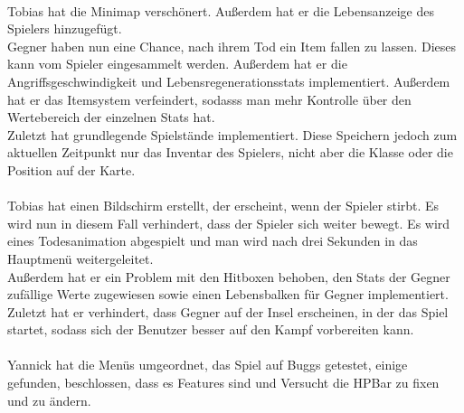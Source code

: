          \\
            Tobias hat die Minimap verschönert.
            Außerdem hat er die Lebensanzeige des Spielers hinzugefügt.\\
            Gegner haben nun eine Chance, nach ihrem Tod ein Item fallen zu lassen. Dieses kann vom Spieler eingesammelt werden.
            Außerdem hat er die Angriffsgeschwindigkeit und Lebensregenerationsstats implementiert.
            Außerdem hat er das Itemsystem verfeindert, sodasss man mehr Kontrolle über den Wertebereich der einzelnen Stats hat.\\
            Zuletzt hat grundlegende Spielstände implementiert.
            Diese Speichern jedoch zum aktuellen Zeitpunkt nur das Inventar des Spielers, nicht aber die Klasse oder die Position auf der Karte.\\

         \\
            Tobias hat einen Bildschirm erstellt, der erscheint, wenn der Spieler stirbt.
            Es wird nun in diesem Fall verhindert, dass der Spieler sich weiter bewegt.
            Es wird eines Todesanimation abgespielt und man wird nach drei Sekunden in das Hauptmenü weitergeleitet.\\
            Außerdem hat er ein Problem mit den Hitboxen behoben, den Stats der Gegner zufällige Werte zugewiesen sowie einen Lebensbalken für Gegner implementiert.\\
            Zuletzt hat er verhindert, dass Gegner auf der Insel erscheinen, in der das Spiel startet, sodass sich der Benutzer besser auf den Kampf vorbereiten kann.\\

         \\
            Yannick hat die Menüs umgeordnet, das Spiel auf Buggs getestet, einige gefunden, beschlossen, dass es Features sind und Versucht die HPBar zu fixen und zu ändern.\\
            

